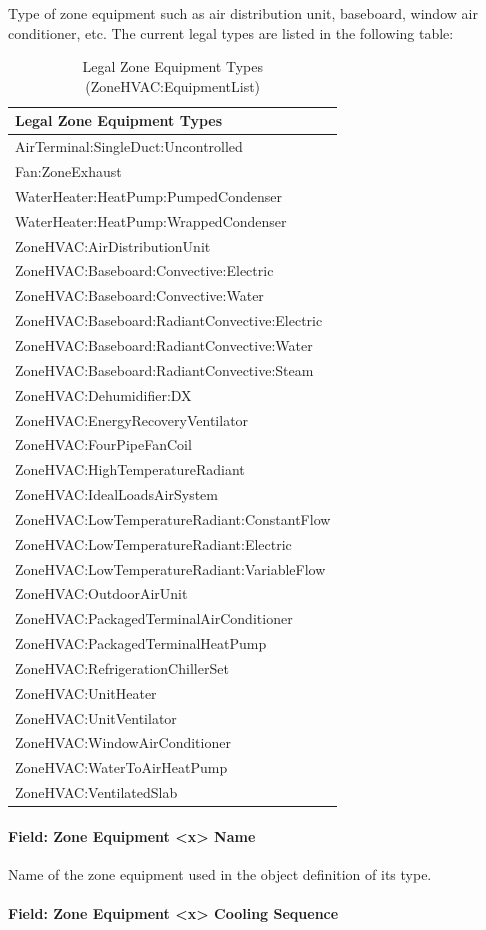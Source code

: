 Type of zone equipment such as air distribution unit, baseboard, window air conditioner, etc. The current legal types are listed in the following table:

\begin{longtable}[c]{@{}l@{}}
\caption{Legal Zone Equipment Types (ZoneHVAC:EquipmentList) \protect \label{table:legal-zone-equipment-types-zonehvac}}\\
\toprule 
Legal Zone Equipment Types \tabularnewline \midrule
\endhead
AirTerminal:SingleDuct:Uncontrolled \tabularnewline
Fan:ZoneExhaust \tabularnewline
WaterHeater:HeatPump:PumpedCondenser \tabularnewline
WaterHeater:HeatPump:WrappedCondenser \tabularnewline
ZoneHVAC:AirDistributionUnit \tabularnewline
ZoneHVAC:Baseboard:Convective:Electric \tabularnewline
ZoneHVAC:Baseboard:Convective:Water \tabularnewline
ZoneHVAC:Baseboard:RadiantConvective:Electric \tabularnewline
ZoneHVAC:Baseboard:RadiantConvective:Water \tabularnewline
ZoneHVAC:Baseboard:RadiantConvective:Steam \tabularnewline
ZoneHVAC:Dehumidifier:DX \tabularnewline
ZoneHVAC:EnergyRecoveryVentilator \tabularnewline
ZoneHVAC:FourPipeFanCoil \tabularnewline
ZoneHVAC:HighTemperatureRadiant \tabularnewline
ZoneHVAC:IdealLoadsAirSystem \tabularnewline
ZoneHVAC:LowTemperatureRadiant:ConstantFlow \tabularnewline
ZoneHVAC:LowTemperatureRadiant:Electric \tabularnewline
ZoneHVAC:LowTemperatureRadiant:VariableFlow \tabularnewline
ZoneHVAC:OutdoorAirUnit \tabularnewline
ZoneHVAC:PackagedTerminalAirConditioner \tabularnewline
ZoneHVAC:PackagedTerminalHeatPump \tabularnewline
ZoneHVAC:RefrigerationChillerSet \tabularnewline
ZoneHVAC:UnitHeater \tabularnewline
ZoneHVAC:UnitVentilator \tabularnewline
ZoneHVAC:WindowAirConditioner \tabularnewline
ZoneHVAC:WaterToAirHeatPump \tabularnewline
ZoneHVAC:VentilatedSlab \tabularnewline
\bottomrule
\end{longtable}

\paragraph{Field: Zone Equipment \textless{}x\textgreater{} Name}\label{field-zone-equipment-x-name}

Name of the zone equipment used in the object definition of its type.

\paragraph{Field: Zone Equipment \textless{}x\textgreater{} Cooling Sequence}\label{field-zone-equipment-x-cooling-sequence}

